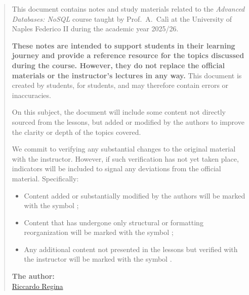 \begin{abstract}
  This document contains notes and study materials related to the \textit{Advanced Databases: NoSQL} course taught by Prof.~A.~Calì at the University of Naples Federico II during the academic year 2025/26.

  \textbf{These notes are intended to support students in their learning journey and provide a reference resource for the topics discussed during the course. However, they do not replace the official materials or the instructor's lectures in any way.}
  This document is created by students, for students, and may therefore contain errors or inaccuracies.

  On this subject, the document will include some content not directly sourced from the lessons, but added or modified by the authors to improve the clarity or depth of the topics covered.

  We commit to verifying any substantial changes to the original material with the instructor. However, if such verification has not yet taken place, indicators will be included to signal any deviations from the official material. Specifically:

  \begin{itemize}
      \item Content added or substantially modified by the authors will be marked with the symbol \warningsymbol{};
      \item Content that has undergone only structural or formatting reorganization will be marked with the symbol \infosymbol{};
      \item Any additional content not presented in the lessons but verified with the instructor will be marked with the symbol \extrasymbol{}.
  \end{itemize}

  \begin{flushright}
    \vspace{2cm}
    \textbf{The author:}\\
    \href{https://github.com/riccardoregina}{Riccardo Regina} \\
  \end{flushright}
\end{abstract}